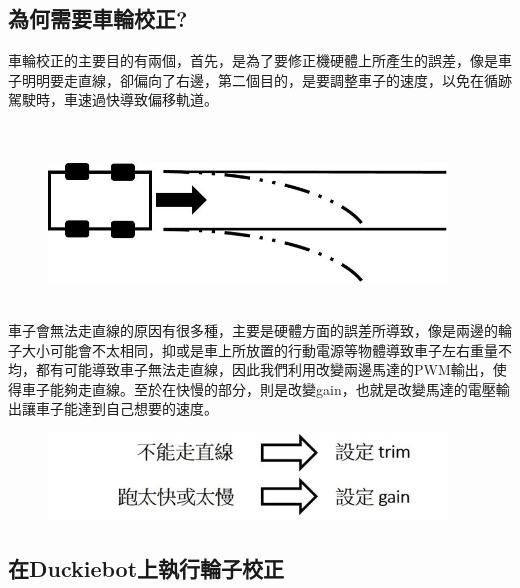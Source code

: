 \documentclass{article}
\begin{document}
\subsection{為何需要車輪校正?}

車輪校正的主要目的有兩個，首先，是為了要修正機硬體上所產生的誤差，像是車子明明要走直線，卻偏向了右邊，第二個目的，是要調整車子的速度，以免在循跡駕駛時，車速過快導致偏移軌道。
\\\\\\
\begin{figure}[htp]
    \begin{center}
        \includegraphics[width=300pt]{pic/圖片22.jpg}
    \end{center}
\end{figure}
\\
車子會無法走直線的原因有很多種，主要是硬體方面的誤差所導致，像是兩邊的輪子大小可能會不太相同，抑或是車上所放置的行動電源等物體導致車子左右重量不均，都有可能導致車子無法走直線，因此我們利用改變兩邊馬達的PWM輸出，使得車子能夠走直線。至於在快慢的部分，則是改變gain，也就是改變馬達的電壓輸出讓車子能達到自己想要的速度。
\\
\begin{figure}[htp]
    \begin{center}
        \includegraphics[width=300pt]{pic/圖片23.jpg}
    \end{center}
\end{figure}

\subsection{在Duckiebot上執行輪子校正}
\end{document}
